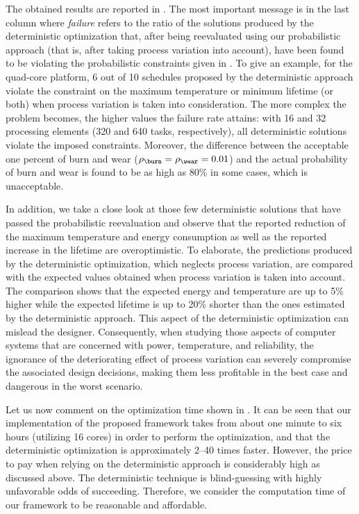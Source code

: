 The obtained results are reported in . The
most important message is in the last column where \emph{failure} refers to the
ratio of the solutions produced by the deterministic optimization that, after
being reevaluated using our probabilistic approach (that is, after taking
process variation into account), have been found to be violating the
probabilistic constraints given in . To
give an example, for the quad-core platform, 6 out of 10 schedules proposed by
the deterministic approach violate the constraint on the maximum temperature or
minimum lifetime (or both) when process variation is taken into consideration.
The more complex the problem becomes, the higher values the failure rate
attains: with 16 and 32 processing elements (320 and 640 tasks, respectively),
all deterministic solutions violate the imposed constraints. Moreover, the
difference between the acceptable one percent of burn and wear ($\rho_\burn =
\rho_\wear = 0.01$) and the actual probability of burn and wear is found to be
as high as 80\% in some cases, which is unacceptable.

In addition, we take a close look at those few deterministic solutions that have
passed the probabilistic reevaluation and observe that the reported reduction of
the maximum temperature and energy consumption as well as the reported increase
in the lifetime are overoptimistic. To elaborate, the predictions produced by
the deterministic optimization, which neglects process variation, are compared
with the expected values obtained when process variation is taken into account.
The comparison shows that the expected energy and temperature are up to 5\%
higher while the expected lifetime is up to 20\% shorter than the ones estimated
by the deterministic approach. This aspect of the deterministic optimization can
mislead the designer. Consequently, when studying those aspects of computer
systems that are concerned with power, temperature, and reliability, the
ignorance of the deteriorating effect of process variation can severely
compromise the associated design decisions, making them less profitable in the
best case and dangerous in the worst scenario.

Let us now comment on the optimization time shown in
. It can be seen that our implementation of
the proposed framework takes from about one minute to six hours (utilizing 16
cores) in order to perform the optimization, and that the deterministic
optimization is approximately 2--40 times faster. However, the price to pay when
relying on the deterministic approach is considerably high as discussed above.
The deterministic technique is blind-guessing with highly unfavorable odds of
succeeding. Therefore, we consider the computation time of our framework to be
reasonable and affordable.

